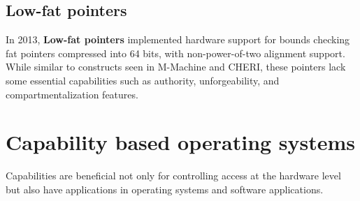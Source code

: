 \subsection{Low-fat pointers}
In 2013, \textbf{Low-fat pointers}\cite{kwon_low-fat_2013} implemented hardware support for bounds checking fat pointers compressed into 
64 bits, with non-power-of-two alignment support. While similar to constructs seen in 
M-Machine and CHERI, these pointers lack some essential capabilities such as authority, 
unforgeability, and compartmentalization features.
\newline


\section{Capability based operating systems}
Capabilities are beneficial not only for controlling access at the hardware level but also 
have applications in operating systems and software applications.
\newline

